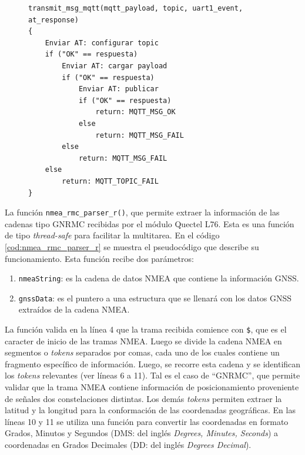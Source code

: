 \begin{figure}[H]
\begin{lstlisting}
transmit_msg_mqtt(mqtt_payload, topic, uart1_event, at_response)
{
	Enviar AT: configurar topic
	if ("OK" == respuesta)
		Enviar AT: cargar payload
		if ("OK" == respuesta)
			Enviar AT: publicar
			if ("OK" == respuesta)
				return: MQTT_MSG_OK
			else
				return: MQTT_MSG_FAIL
		else
			return: MQTT_MSG_FAIL
	else
		return: MQTT_TOPIC_FAIL
}

\end{lstlisting}
\label{cod:transmit_msg_mqtt}
\end{figure}
 
La función \verb|nmea_rmc_parser_r()|, que permite extraer la información de las cadenas tipo GNRMC recibidas por el módulo Quectel L76. Esta es una función de tipo \textit{thread-safe} para facilitar la multitarea. En el código \ref{cod:nmea_rmc_parser_r} se muestra el pseudocódigo que describe su funcionamiento. Esta función recibe dos parámetros:
\begin{enumerate}
\item \verb|nmeaString|: es la cadena de datos NMEA que contiene la información GNSS.
\item \verb|gnssData|: es el puntero a una estructura que se llenará con los datos GNSS extraídos de la cadena NMEA.
\end{enumerate}

La función valida en la línea 4 que la trama recibida comience con \verb|$|, que es el caracter de inicio de las tramas NMEA. Luego se divide la cadena NMEA en segmentos o \textit{tokens} separados por comas, cada uno de los cuales contiene un fragmento específico de información. Luego, se recorre esta cadena y se identifican los \textit{tokens} relevantes (ver líneas 6 a 11). Tal es el caso de ``GNRMC'', que permite validar que la trama NMEA contiene información de posicionamiento proveniente de señales dos constelaciones distintas. Los demás \textit{tokens} permiten extraer la latitud y la longitud para la conformación de las coordenadas geográficas. En las líneas 10 y 11 se utiliza una función para convertir las coordenadas en formato Grados, Minutos y Segundos (DMS: del inglés \textit{Degrees, Minutes, Seconds}) a coordenadas en Grados Decimales (DD: del inglés \textit{Degrees Decimal}).


